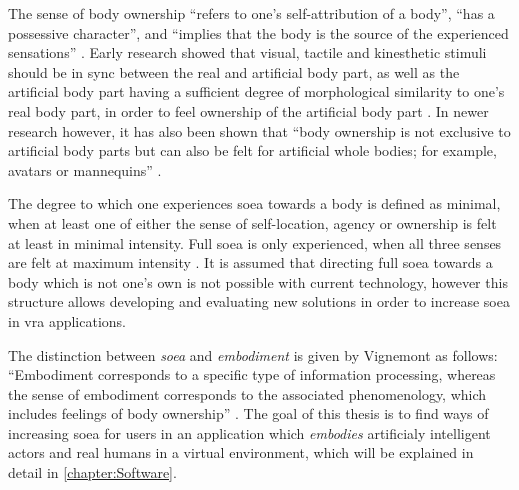 The sense of body ownership \enquote{refers to one’s self-attribution of a body}, \enquote{has a possessive character}, and \enquote{implies that the body is the source of the experienced sensations} \autocite[p. ~5]{senseEmbodimentVR}.
\newline
Early research showed that visual, tactile and kinesthetic stimuli should be in sync between the real and artificial body part, as well as the artificial body part having a sufficient degree of morphological similarity to one's real body part, in order to feel ownership of the artificial body part \autocite{senseEmbodimentVR}. In newer research however, it has also been shown that \enquote{body ownership is not exclusive to artificial body parts but can also be felt for artificial whole bodies; for example, avatars or mannequins} \autocite[p. ~5]{senseEmbodimentVR}.
\newline

The degree to which one experiences \gls{soea} towards a body is defined as minimal, when at least one of either the sense of self-location, agency or ownership is felt at least in minimal intensity. Full \gls{soea} is only experienced, when all three senses are felt at maximum intensity \autocite{senseEmbodimentVR}. It is assumed that directing full \gls{soea} towards a body which is not one's own is not possible with current technology, however this structure allows developing and evaluating new solutions in order to increase \gls{soea} in \gls{vra} applications.
\newline

The distinction between \textit{\gls{soea}} and \textit{embodiment} is given by Vignemont as follows: \enquote{Embodiment corresponds to a specific type of information processing, whereas the sense of embodiment corresponds to the associated phenomenology, which includes feelings of body ownership} \autocite[p. ~3]{embodimentOwnership}.
The goal of this thesis is to find ways of increasing \gls{soea} for users in an application which \textit{embodies} artificialy intelligent actors and real humans in a virtual environment, which will be explained in detail in \autoref{chapter:Software}.